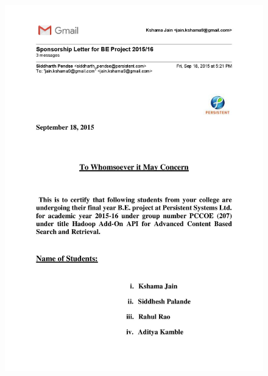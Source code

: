 \documentclass[oneside,a4paper,12pt]{report}
\begin{document}
{   \setlength{\parindent}{11mm} }
\begin{center}
	\begin{figure}[!htbp]
		\centering
		\includegraphics[width=\textwidth]{sponsorship-letter-1}
	\end{figure}
\end{center}
\end{document}
